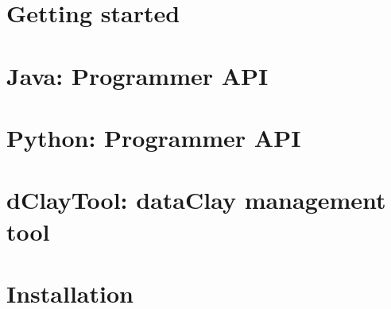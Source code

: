 \documentclass[11pt,fleqn]{book} %
\begin{document}
\tableofcontents %

\cleardoublepage %

\pagestyle{fancy} %

\renewcommand\labelitemi{}
\setlength{\parindent}{0pt}



\part{Getting started}
  
  
  

\part{Java: Programmer API}
  
%  
%  

\part{Python: Programmer API}
  
%  
%  
%  

\part{dClayTool: dataClay management tool}
  

%  
%  
%  

\part{Installation}
\label{part:installation}
  
  
\end{document}
